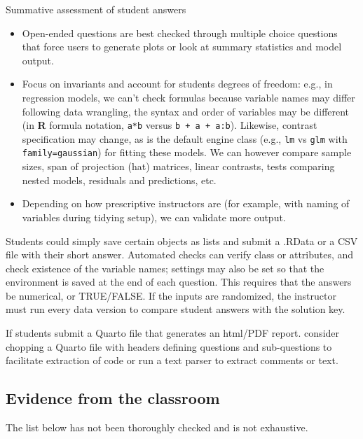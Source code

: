 \documentclass[
  letterpaper,
  DIV=11,
  numbers=noendperiod]{scrartcl}
\providecommand{\tightlist}{%
  \setlength{\itemsep}{0pt}\setlength{\parskip}{0pt}}
\begin{document}
Summative assessment of student answers

\begin{itemize}
\tightlist
\item
  Open-ended questions are best checked through multiple choice
  questions that force users to generate plots or look at summary
  statistics and model output.
\item
  Focus on invariants and account for students degrees of freedom: e.g.,
  in regression models, we can't check formulas because variable names
  may differ following data wrangling, the syntax and order of variables
  may be different (in \textbf{R} formula notation, \texttt{a*b} versus
  \texttt{b\ +\ a\ +\ a:b}). Likewise, contrast specification may
  change, as is the default engine class (e.g., \texttt{lm} vs
  \texttt{glm} with \texttt{family=gaussian}) for fitting these models.
  We can however compare sample sizes, span of projection (hat)
  matrices, linear contrasts, tests comparing nested models, residuals
  and predictions, etc.
\item
  Depending on how prescriptive instructors are (for example, with
  naming of variables during tidying setup), we can validate more
  output.
\end{itemize}

Students could simply save certain objects as lists and submit a .RData
or a CSV file with their short answer. Automated checks can verify class
or attributes, and check existence of the variable names; settings may
also be set so that the environment is saved at the end of each
question. This requires that the answers be numerical, or TRUE/FALSE. If
the inputs are randomized, the instructor must run every data version to
compare student answers with the solution key.

If students submit a Quarto file that generates an html/PDF report.
consider chopping a Quarto file with headers defining questions and
sub-questions to facilitate extraction of code or run a text parser to
extract comments or text.

\subsection{Evidence from the
classroom}\label{evidence-from-the-classroom}

\begin{tcolorbox}[enhanced jigsaw, bottomrule=.15mm, title=\textcolor{quarto-callout-caution-color}{\faFire}\hspace{0.5em}{Caution}, opacityback=0, left=2mm, colbacktitle=quarto-callout-caution-color!10!white, toprule=.15mm, breakable, titlerule=0mm, colback=white, coltitle=black, leftrule=.75mm, opacitybacktitle=0.6, colframe=quarto-callout-caution-color-frame, arc=.35mm, bottomtitle=1mm, rightrule=.15mm, toptitle=1mm]

The list below has not been thoroughly checked and is not exhaustive.

\end{tcolorbox}
\end{document}
